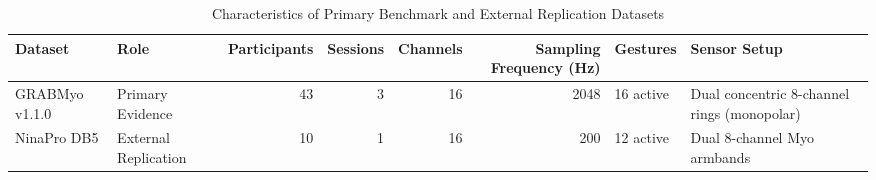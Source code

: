\begin{table}
\caption{Characteristics of Primary Benchmark and External Replication Datasets}
\label{tab:datasets}
\begin{tabular}{llrrrrll}
\toprule
Dataset & Role & Participants & Sessions & Channels & Sampling Frequency (Hz) & Gestures & Sensor Setup \\
\midrule
GRABMyo v1.1.0 & Primary Evidence & 43 & 3 & 16 & 2048 & 16 active & Dual concentric 8-channel rings (monopolar) \\
NinaPro DB5 & External Replication & 10 & 1 & 16 & 200 & 12 active & Dual 8-channel Myo armbands \\
\bottomrule
\end{tabular}
\end{table}

